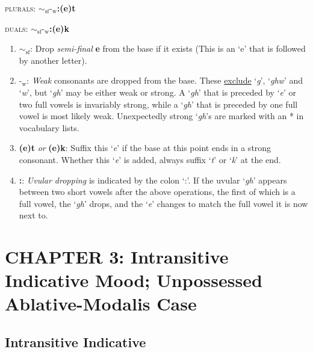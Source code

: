 \documentclass{article}
\begin{document}
\textsc{plurals}: \textbf{${\sim}_\text{sf}\text{-}_\text{w}$:(e)t}

\noindent \textsc{duals}: \textbf{${\sim}_\text{sf}\text{-}_\text{w}$:(e)k}

\begin{enumerate}
\item \textbf{${\sim}_\text{sf}$}: Drop \textit{semi-final} \textbf{e} from the base if it exists (This is an `e' that is followed by another letter).
\item \textbf{$\text{-}_\text{w}$}: \textit{Weak} consonants are dropped from the base. These \underline{exclude} `\textit{g}', `\textit{ghw}' and `\textit{w}', but `\textit{gh}' may be either weak or strong. A `\textit{gh}' that is preceded by `\textit{e}' or two full vowels is invariably strong, while a `\textit{gh}' that is preceded by one full vowel is most likely weak. Unexpectedly strong `\textit{gh}'s are marked with an * in vocabulary lists.
\item \textbf{(e)t} \textit{or} \textbf{(e)k}: Suffix this `\textit{e}' if the base at this point ends in a strong consonant. Whether this `\textit{e}' is added, always suffix `\textit{t}' or `\textit{k}' at the end.
\item \textbf{:}: \textit{Uvular dropping} is indicated by the colon `:'. If the uvular `\textit{gh}' appears between two short vowels after the above operations, the first of which is a full vowel, the `\textit{gh}' drops, and the `\textit{e}' changes to match the full vowel it is now next to.
\end{enumerate}


\section{CHAPTER 3: Intransitive Indicative Mood; Unpossessed Ablative-Modalis Case}

\subsection{Intransitive Indicative}
\end{document}
